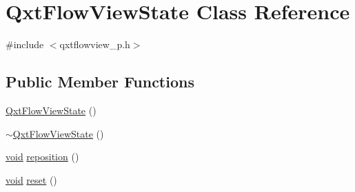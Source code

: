\hypertarget{class_qxt_flow_view_state}{\section{Qxt\-Flow\-View\-State Class Reference}
\label{class_qxt_flow_view_state}
}


{\ttfamily \#include $<$qxtflowview\-\_\-p.\-h$>$}

\subsection*{Public Member Functions}
\begin{DoxyCompactItemize}
\item 
\hyperlink{class_qxt_flow_view_state_a1c7bae5fc37d8c705a832543cec99ad7}{Qxt\-Flow\-View\-State} ()
\item 
\hyperlink{class_qxt_flow_view_state_a89258516ebb28d8644351d0b7c575fe0}{$\sim$\-Qxt\-Flow\-View\-State} ()
\item 
\hyperlink{group___u_a_v_objects_plugin_ga444cf2ff3f0ecbe028adce838d373f5c}{void} \hyperlink{class_qxt_flow_view_state_ab64a7b2ca4b94384cc1607c0aec0f1b1}{reposition} ()
\item 
\hyperlink{group___u_a_v_objects_plugin_ga444cf2ff3f0ecbe028adce838d373f5c}{void} \hyperlink{class_qxt_flow_view_state_a57cfd4b850434dbe7e28d9caf2a0eb96}{reset} ()
\end{DoxyCompactItemize}

